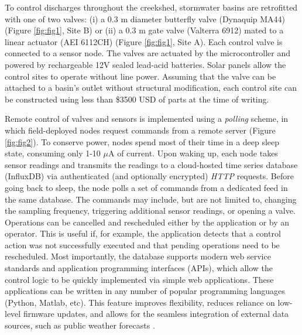 To control discharges throughout the creekshed, stormwater basins are retrofitted with one of two valves: (i) a 0.3 m diameter butterfly valve (Dynaquip MA44) (Figure \ref{fig:fig1}, Site B) or (ii) a 0.3 m gate valve (Valterra 6912) mated to a linear actuator (AEI 6112CH) (Figure \ref{fig:fig1}, Site A). Each control valve is connected to a sensor node. The valves are actuated by the microcontroller and powered by rechargeable 12V sealed lead-acid batteries. Solar panels allow the control sites to operate without line power. Assuming that the valve can be attached to a basin's outlet without structural modification, each control site can be constructed using less than \$3500 USD of parts at the time of writing.

Remote control of valves and sensors is implemented using a \textit{polling} scheme, in which field-deployed nodes request commands from a remote server (Figure \ref{fig:fig2}). To conserve power, nodes spend most of their time in a deep sleep state, consuming only 1-10 $\mu$A of current. Upon waking up, each node takes sensor readings and transmits the readings to a cloud-hosted time series database (InfluxDB) via authenticated (and optionally encrypted) \textit{HTTP} requests. Before going back to sleep, the node polls a set of commands from a dedicated feed in the same database. The commands may include, but are not limited to, changing the sampling frequency, triggering additional sensor readings, or opening a valve.
Operations can be cancelled and rescheduled either by the application or by an operator. This is useful if, for example, the application detects that a control action was not successfully executed and that pending operations need to be rescheduled. Most importantly, the database supports modern web service standards and application programming interfaces (APIs), which allow the control logic to be quickly implemented via simple web applications. These applications can be written in any number of popular programming languages (Python, Matlab, etc). This feature improves flexibility, reduces reliance on low-level firmware updates, and allows for the seamless integration of external data sources, such as public weather forecasts \cite{Wong_2016b, Bartos_2018}.

